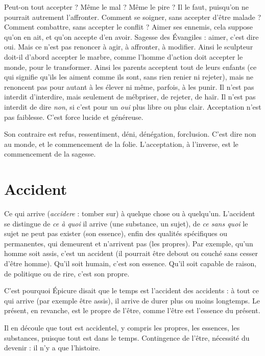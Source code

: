 Peut-on tout accepter ? Même le mal ? Même le pire ? Il le faut, puisqu'on
ne pourrait autrement l’affronter. Comment se soigner, sans accepter d’être
malade ? Comment combattre, sans accepter le conflit ? Aimer ses ennemis,
cela suppose qu’on en ait, et qu’on accepte d’en avoir. Sagesse des Évangiles :
aimer, c’est dire oui. Mais ce n’est pas renoncer à agir, à affronter, à modifier.
Ainsi le sculpteur doit-il d’abord accepter le marbre, comme l’homme d’action
doit accepter le monde, pour le transformer. Ainsi les parents acceptent tout de
leurs enfants (ce qui signifie qu’ils les aiment comme ils sont, sans rien renier
ni rejeter), mais ne renoncent pas pour autant à les élever ni même, parfois, à
les punir. Il n’est pas interdit d’interdire, mais seulement de mébpriser, de
rejeter, de haïr. Il n’est pas interdit de dire {\it non}, si c’est pour un {\it oui} plus libre
ou plus clair. Acceptation n’est pas faiblesse. C’est force lucide et généreuse.

Son contraire est refus, ressentiment, déni, dénégation, forclusion. C’est
dire non au monde, et le commencement de la folie. L’acceptation, à l’inverse,
est le commencement de la sagesse.

\section{Accident}
Ce qui arrive ({\it accidere} : tomber sur) à quelque chose ou à quelqu’un.
L'accident se distingue de {\it ce à quoi} il arrive (une substance,
un sujet), de {\it ce sans quoi} le sujet ne peut pas exister (son essence), enfin
des qualités spécifiques ou permanentes, qui demeurent et n’arrivent pas (les
propres). Par exemple, qu’un homme soit assis, c’est un accident (il pourrait
être debout ou couché sans cesser d’être homme). Qu'il soit humain, c’est
son essence. Qu'il soit capable de raison, de politique ou de rire, c’est son
propre.

C’est pourquoi Épicure disait que le temps est l'accident des accidents : à
tout ce qui arrive (par exemple être assis), il arrive de durer plus ou moins longtemps.
Le présent, en revanche, est le propre de l'être, comme l'être est
l'essence du présent.

Il en découle que tout est accidentel, y compris les propres, les essences, les
substances, puisque tout est dans le temps. Contingence de l’être, nécessité du
devenir : il n’y a que l’histoire.

